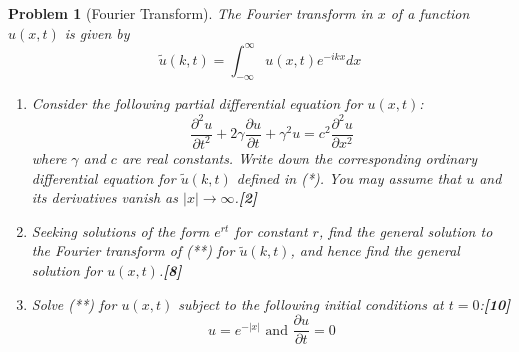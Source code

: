 \documentclass[a4paper]{article}
\theoremstyle{new}
\newtheorem{qns}{Problem}[section]
\begin{document}
\begin{qns}[Fourier Transform]
The Fourier transform in $x$ of a function $u(x, t)$ is given by
\begin{equation}
    \tilde{u}(k,t)=\int_{-\infty}^\infty u(x,t)e^{-ikx}dx\tag{*}
\end{equation}
\begin{enumerate}[label=(\roman*)]
\item Consider the following partial differential equation for $u(x, t)$:
\begin{equation}
    \frac{\partial^2u}{\partial t^2}+2\gamma\frac{\partial u}{\partial t}+\gamma^2u=c^2\frac{\partial^2u}{\partial x^2}\tag{**}
\end{equation}
where $\gamma$ and $c$ are real constants. Write down the corresponding ordinary differential equation for $\tilde{u}(k,t)$ defined in (*). You may assume that $u$ and its derivatives vanish
as $|x|\rightarrow\infty$.\hfill\textbf{[2]}
\item Seeking solutions of the form $e^{rt}$ for constant $r$, find the general solution to the Fourier transform of (**) for $\tilde{u}(k, t)$, and hence find the general solution for $u(x, t)$.\hfill\textbf{[8]}
\item Solve (**) for $u(x, t)$ subject to the following initial conditions at $t = 0$:\hfill\textbf{[10]}
$$u=e^{-|x|}\text{ and }\frac{\partial u}{\partial t}=0$$
\end{enumerate}
\end{qns}
\newpage
\end{document}
